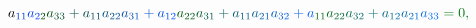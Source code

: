 \documentclass[12pt]{article}
\begin{document}
\begin{displaymath}
{a} _ { \mathcolor[RGB]{0,60,210}{1} \mathcolor[RGB]{0,60,225}{1} } \mathcolor[RGB]{0,60,240}{a} _ { \mathcolor[RGB]{0,60,255}{2} \mathcolor[RGB]{0,75,0}{2} } \mathcolor[RGB]{0,75,15}{a} _ { \mathcolor[RGB]{0,75,30}{3} \mathcolor[RGB]{0,75,45}{3} } \mathcolor[RGB]{0,75,60}{+} \mathcolor[RGB]{0,75,75}{a} _ { \mathcolor[RGB]{0,75,90}{1} \mathcolor[RGB]{0,75,105}{1} } \mathcolor[RGB]{0,75,120}{a} _ { \mathcolor[RGB]{0,75,135}{2} \mathcolor[RGB]{0,75,150}{2} } \mathcolor[RGB]{0,75,165}{a} _ { \mathcolor[RGB]{0,75,180}{3} \mathcolor[RGB]{0,75,195}{1} } \mathcolor[RGB]{0,75,210}{+} \mathcolor[RGB]{0,75,225}{a} _ { \mathcolor[RGB]{0,75,240}{1} \mathcolor[RGB]{0,75,255}{2} } \mathcolor[RGB]{0,90,0}{a} _ { \mathcolor[RGB]{0,90,15}{2} \mathcolor[RGB]{0,90,30}{2} } \mathcolor[RGB]{0,90,45}{a} _ { \mathcolor[RGB]{0,90,60}{3} \mathcolor[RGB]{0,90,75}{1} } \mathcolor[RGB]{0,90,90}{+} \mathcolor[RGB]{0,90,105}{a} _ { \mathcolor[RGB]{0,90,120}{1} \mathcolor[RGB]{0,90,135}{1} } \mathcolor[RGB]{0,90,150}{a} _ { \mathcolor[RGB]{0,90,165}{2} \mathcolor[RGB]{0,90,180}{1} } \mathcolor[RGB]{0,90,195}{a} _ { \mathcolor[RGB]{0,90,210}{3} \mathcolor[RGB]{0,90,225}{2} } \mathcolor[RGB]{0,90,240}{+} \mathcolor[RGB]{0,90,255}{a} _ { \mathcolor[RGB]{0,105,0}{1} \mathcolor[RGB]{0,105,15}{1} } \mathcolor[RGB]{0,105,30}{a} _ { \mathcolor[RGB]{0,105,45}{2} \mathcolor[RGB]{0,105,60}{2} } \mathcolor[RGB]{0,105,75}{a} _ { \mathcolor[RGB]{0,105,90}{3} \mathcolor[RGB]{0,105,105}{2} } \mathcolor[RGB]{0,105,120}{+} \mathcolor[RGB]{0,105,135}{a} _ { \mathcolor[RGB]{0,105,150}{1} \mathcolor[RGB]{0,105,165}{2} } \mathcolor[RGB]{0,105,180}{a} _ { \mathcolor[RGB]{0,105,195}{2} \mathcolor[RGB]{0,105,210}{1} } \mathcolor[RGB]{0,105,225}{a} _ { \mathcolor[RGB]{0,105,240}{3} \mathcolor[RGB]{0,105,255}{3} } \mathcolor[RGB]{0,120,0}{=} \mathcolor[RGB]{0,120,15}{0} \mathcolor[RGB]{0,120,30}{,} \mathcolor[RGB]{0,120,45}{\,
}
\end{displaymath}
\end{document}
